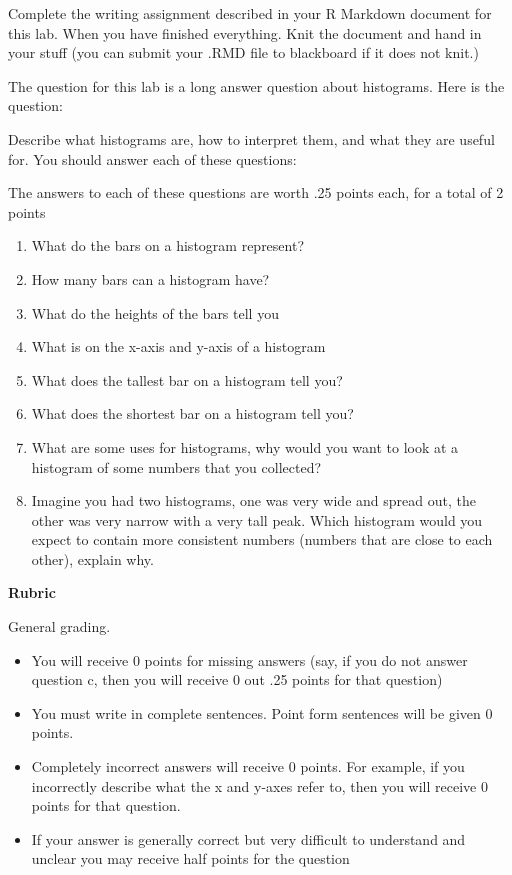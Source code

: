 \documentclass[
]{book}
\providecommand{\tightlist}{%
  \setlength{\itemsep}{0pt}\setlength{\parskip}{0pt}}
\begin{document}
Complete the writing assignment described in your R Markdown document for this lab. When you have finished everything. Knit the document and hand in your stuff (you can submit your .RMD file to blackboard if it does not knit.)

The question for this lab is a long answer question about histograms. Here is the question:

Describe what histograms are, how to interpret them, and what they are useful for. You should answer each of these questions:

The answers to each of these questions are worth .25 points each, for a total of 2 points

\begin{enumerate}
\def\labelenumi{\alph{enumi}.}
\tightlist
\item
  What do the bars on a histogram represent?
\item
  How many bars can a histogram have?
\item
  What do the heights of the bars tell you
\item
  What is on the x-axis and y-axis of a histogram
\item
  What does the tallest bar on a histogram tell you?
\item
  What does the shortest bar on a histogram tell you?
\item
  What are some uses for histograms, why would you want to look at a histogram of some numbers that you collected?
\item
  Imagine you had two histograms, one was very wide and spread out, the other was very narrow with a very tall peak. Which histogram would you expect to contain more consistent numbers (numbers that are close to each other), explain why.
\end{enumerate}

\textbf{Rubric}

General grading.

\begin{itemize}
\tightlist
\item
  You will receive 0 points for missing answers (say, if you do not answer question c, then you will receive 0 out .25 points for that question)
\item
  You must write in complete sentences. Point form sentences will be given 0 points.
\item
  Completely incorrect answers will receive 0 points. For example, if you incorrectly describe what the x and y-axes refer to, then you will receive 0 points for that question.
\item
  If your answer is generally correct but very difficult to understand and unclear you may receive half points for the question
\end{itemize}
\end{document}
